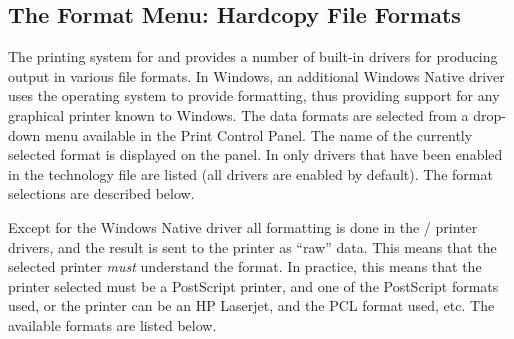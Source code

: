 \subsection{The {\cb Format} Menu: Hardcopy File Formats}
\label{hcformat}

The printing system for {\Xic} and {\WRspice} provides a number of
built-in drivers for producing output in various file formats.  In
Windows, an additional {\et Windows Native} driver uses the operating
system to provide formatting, thus providing support for any graphical
printer known to Windows.  The data formats are selected from a
drop-down menu available in the {\cb Print Control Panel}.  The name
of the currently selected format is displayed on the panel.  In {\Xic}
only drivers that have been enabled in the technology file are listed
(all drivers are enabled by default).  The format selections are
described below.

Except for the {\et Windows Native} driver all formatting is done in the
{\Xic}/{\WRspice} printer drivers, and the result is sent to the
printer as ``raw'' data.  This means that the selected printer {\it
must} understand the format.  In practice, this means that the printer
selected must be a PostScript printer, and one of the PostScript
formats used, or the printer can be an HP Laserjet, and the PCL format
used, etc.  The available formats are listed below.

